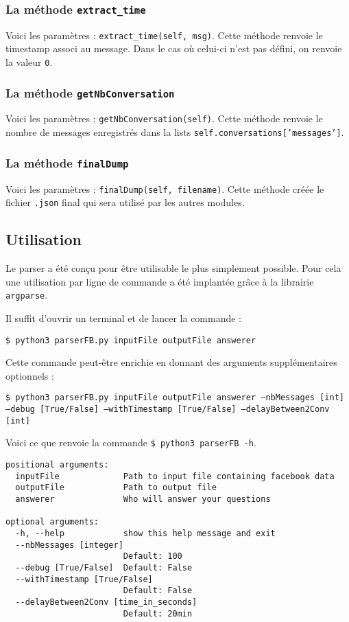 \documentclass[10pt,a4paper]{article}
\begin{document}
\subsubsection{La méthode \texttt{extract\_time}}
Voici les paramètres : \texttt{extract\_time(self, msg)}. Cette méthode renvoie le timestamp associ au message. Dans le cas où celui-ci n'est pas défini, on renvoie la valeur \texttt{0}.

\subsubsection{La méthode \texttt{getNbConversation}}
Voici les paramètres : \texttt{getNbConversation(self)}. Cette méthode renvoie le nombre de messages enregistrés dans la lists \texttt{self.conversations['messages']}.

\subsubsection{La méthode \texttt{finalDump}}
Voici les paramètres : \texttt{finalDump(self, filename)}. Cette méthode créée le fichier \texttt{.json} final qui sera utilisé par les autres modules.

\subsection{Utilisation}
Le parser a été conçu pour être utilisable le plus simplement possible. Pour cela une utilisation par ligne de commande a été implantée grâce à la librairie \texttt{argparse}.

Il suffit d'ouvrir un terminal et de lancer la commande :

\begin{center}
    \texttt{\$ python3 parserFB.py inputFile outputFile answerer}
\end{center}

Cette commande peut-être enrichie en donnant des arguments supplémentaires optionnels :

\begin{center}
    \texttt{\$ python3 parserFB.py inputFile outputFile answerer --nbMessages [int] --debug [True/False] --withTimestamp [True/False] --delayBetween2Conv [int]}
\end{center}

Voici ce que renvoie la commande \texttt{\$ python3 parserFB -h}.

\begin{verbatim}
positional arguments:
  inputFile             Path to input file containing facebook data
  outputFile            Path to output file
  answerer              Who will answer your questions

optional arguments:
  -h, --help            show this help message and exit
  --nbMessages [integer]
                        Default: 100
  --debug [True/False]  Default: False
  --withTimestamp [True/False]
                        Default: False
  --delayBetween2Conv [time_in_seconds]
                        Default: 20min

\end{verbatim}
\end{document}
